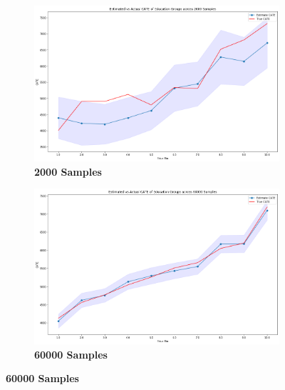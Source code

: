 \documentclass[12pt]{article}
\begin{document}
\begin{figure}[!htp]
\caption{Estimated vs. Actual CATE across Education Level}
	\centering
	\begin{subfigure} [h] {0.45\linewidth}
		\caption{\textbf{2000 Samples}}
   	 	\includegraphics[width = \linewidth]{Graphs/s2_educ2000.png}
	\end{subfigure}
	\begin{subfigure} [h] {0.45\linewidth}
		\caption{\textbf{60000 Samples}}
   	 	\includegraphics[width = \linewidth]{Graphs/s2_educ60000.png}
	\end{subfigure}
\end{figure} 
\end{document}
